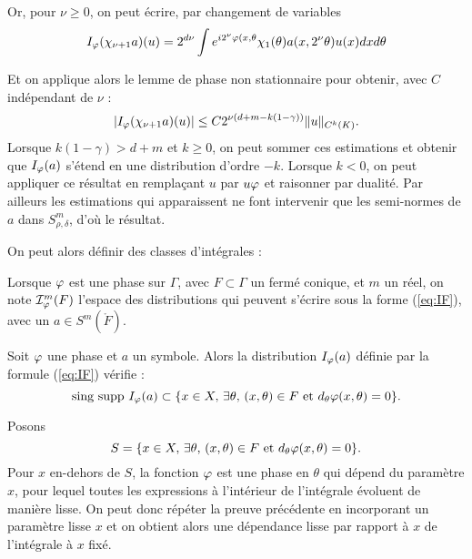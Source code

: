 \begin{preuve}
Or, pour $\nu\geq 0$, on peut écrire, par changement de variables
\begin{equation*}
  I_{\varphi}(\chi_{\nu+1}a)(u)=2^{d\nu}\int e^{i2^{\nu}\varphi(x,\theta}\chi_1(\theta)a(x,2^{\nu}\theta)u(x)dxd\theta
\end{equation*}

Et on applique alors le lemme de phase non stationnaire pour obtenir, avec $C$ indépendant de $\nu$ :
\begin{equation*}
  |I_{\varphi}(\chi_{\nu+1}a)(u)| \leq C2^{\nu(d+m-k(1-\gamma))}\|u\|_{C^k(K)}.
\end{equation*}
Lorsque $k(1-\gamma)>d+m$ et $k\geq 0$, on peut sommer ces estimations et obtenir que $I_{\varphi}(a)$ s'étend en une distribution d'ordre $-k$. Lorsque $k<0$, on peut appliquer ce résultat en remplaçant $u$ par $u\varphi$ et raisonner par dualité. Par ailleurs les estimations qui apparaissent ne font intervenir que les semi-normes de $a$ dans $S^m_{\rho,\delta}$, d'où le résultat.
\end{preuve}

On peut alors définir des classes d'intégrales :
\begin{defn}
Lorsque $\varphi$ est une phase sur $\Gamma$, avec $F\subset \Gamma$ un fermé conique, et $m$ un réel, on note $\mathcal{I}^m_{\varphi}(F)$ l'espace des distributions qui peuvent s'écrire sous la forme (\ref{eq:IF}), avec un $a \in S^m(\mathring{F})$. 
\end{defn}

\begin{prop}
	Soit $\varphi$ une phase et $a$ un symbole. Alors la distribution $I_{\varphi}(a)$ définie par la formule (\ref{eq:IF}) vérifie :
	\begin{equation*}
	\text{sing supp }I_{\varphi}(a) \subset \{x \in X,\,\exists \theta,\,(x,\theta)\in F \text{ et } d_{\theta}\varphi(x,\theta)=0\}.
	\end{equation*}
\end{prop}
\begin{preuve}
	Posons
	\begin{equation*}
	S=\{x \in X,\,\exists \theta,\,(x,\theta)\in F \text{ et } d_{\theta}\varphi(x,\theta)=0\}.
	\end{equation*}
	Pour $x$ en-dehors de $S$, la fonction $\varphi$ est une phase en $\theta$ qui dépend du paramètre $x$, pour lequel toutes les expressions à l'intérieur de l'intégrale évoluent de manière lisse. On peut donc répéter la preuve précédente en incorporant un paramètre lisse $x$ et on obtient alors une dépendance lisse par rapport à $x$ de l'intégrale à $x$ fixé.
\end{preuve}
